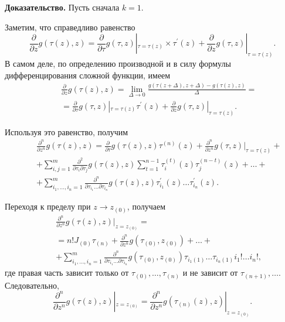      \textbf{ Доказательство.} Пусть сначала $k=1$.

     Заметим, что справедливо равенство
     $$
     \frac{\partial}{\partial z}
     g\left(\tau(z),z\right)=\frac{\partial}{\partial \tau}
     g(\tau,z)|_{\tau=\tau(z)} \times
     \tau^{'}(z)+\frac{\partial}{\partial z} g(\tau,z)|_{\tau=\tau(z)}.
     $$
     В самом деле, по определению производной и в силу формулы
     дифференцирования сложной функции, имеем \begin{align}
     &&\frac{\partial}{\partial z} g(\tau(z),z)=\lim_{\Delta\to 0}
     \frac{g(\tau(z+\Delta),z+\Delta)-g(\tau(z),z)}{\Delta} = \nonumber\\
         &&=\frac{\partial}{\partial \tau} g(\tau,z)|_{\tau=\tau(z)}
         \tau^{'}(z)+ \frac{\partial}{\partial z} g(\tau,z)|_{\tau=\tau(z)}.
         \nonumber \end{align}

         Используя это равенство, получим \begin{align} &&\frac{\partial^n}{\partial
             z^n} g(\tau(z),z)= \frac{\partial}{\partial \tau}g(\tau(z),z)
    \tau^{(n)}(z) +
    \frac{\partial^n}{\partial z^n} g(\tau,z)|_{\tau=\tau(z)}+\nonumber \\
        &&+\sum^m_{i,j=1}\frac{\partial^2}{\partial\tau_i\partial\tau_j}
        g\left(\tau(z),z\right)\sum^{n-1}_{t=1}\tau^{(t)}_i(z)\tau^{(n-t)}_j(z)
    +\ldots+\nonumber\\
        &&+\sum^m_{i_1,\ldots,i_n=1}
        \frac{\partial^n}{\partial\tau_{i_1}\ldots\partial\tau_{i_n}}
        g\left(\tau(z),z\right) \tau^{'}_{i_1}(z)\ldots
        \tau^{'}_{i_n}(z).\nonumber \end{align}

        Переходя к пределу при $z\to z_{(0)}$, получаем \begin{align}
        &&\frac{\partial^n}{\partial z^n} g(\tau(z),z)|_{z=z_{(0)}}= \nonumber \\
            &&=n! J_{(0)}\tau_{(n)}+\frac{\partial^n}{\partial z^n}
            g(\tau_{(0)},
                    z_{(0)})+\ldots+  \\
                &&+\sum^m_{i_1,\ldots,i_n=1}
                \frac{\partial^n}{\partial\tau_{i_1}\ldots\partial\tau_{i_n}}
                g(\tau_{(0)},z_{(0)})\tau_{i_1(1)}\ldots\tau_{i_n(1)} i_1!\ldots
                i_n!, \nonumber \end{align} где правая часть зависит только от
                $\tau_{(0)},\ldots,\tau_{(n)}$ и не зависит от
                $\tau_{(n+1)},\ldots$. Следовательно,
                $$
                \frac{\partial^n}{\partial z^n} g\left(\tau(z),z\right)|_{z=z_{(0)}}
                = \frac{\partial^n}{\partial z^n}
                g\left(\tau_{(n)}(z),z\right)|_{z=z_{(0)}}.
                $$

